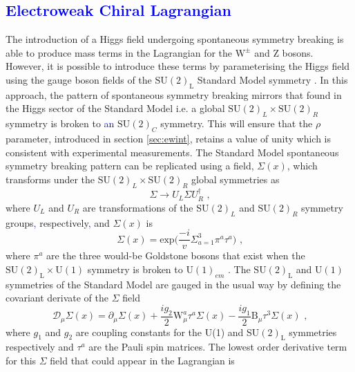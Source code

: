 \subsection{\textcolor{blue}{Electroweak Chiral Lagrangian}}
\label{sec:ewchiral}
The introduction of a Higgs field undergoing spontaneous symmetry breaking is able to produce mass terms in the Lagrangian for the $\text{W}^{\pm}$ and Z bosons.  However, it is possible to introduce these terms by parameterising the Higgs field using the gauge boson fields of the $\text{SU}(2)_{\text{L}}$ Standard Model symmetry \cite{Herrero:1994tj}.  In this approach, the pattern of spontaneous symmetry breaking mirrors that found in the Higgs sector of the Standard Model i.e. a global $\text{SU}(2)_{L} \times \text{SU}(2)_{R}$ symmetry is broken to \textcolor{blue}{an} $\text{SU}(2)_{C}$ symmetry.  This will ensure that the $\rho$ parameter, introduced in section \ref{sec:ewint}, retains a value of unity which is consistent with experimental measurements.  The Standard Model spontaneous symmetry breaking pattern can be replicated using a field, $\Sigma(x)$, which transforms under the $\text{SU}(2)_{L} \times \text{SU}(2)_{R}$ global symmetries as
%
\begin{equation}
\Sigma \rightarrow U_{L} \Sigma U_{R}^{\dagger} \text{ ,}
\end{equation}
%
\noindent where $U_{L}$ and $U_{R}$ are transformations of the $\text{SU}(2)_{L}$ and $\text{SU}(2)_{R}$ symmetry groups\textcolor{blue}{,} respectively\textcolor{blue}{,} and $\Sigma(x)$ is
%
\begin{equation}
\Sigma(x) = \text{exp} \bigg(\frac{-i}{v} \Sigma^{3}_{a=1} \pi^{a}\tau^{a}\bigg)\text{ ,}
\end{equation}
%
\noindent where $\pi^{a}$ are the three would-be Goldstone bosons that exist when the $\text{SU}(2)_{\text{L}} \times \text{U}(1)$ symmetry is broken to $\text{U}(1)_{em}$ \cite{Longhitano:1980tm}.  The $\text{SU}(2)_{\text{L}}$ and $\text{U}(1)$ symmetries of the Standard Model are gauged in the usual way by defining the covariant derivate of the $\Sigma$ field
%
\begin{equation}
\mathcal{D}_{\mu} \Sigma(x) = \partial_{\mu} \Sigma(x) + \frac{ig_{2}}{2}\text{W}_{\mu}^{a}\tau^{a}\Sigma(x) - \frac{ig_{1}}{2}\text{B}_{\mu}\tau^{3}\Sigma(x) \text{ ,}
\end{equation}
%
\noindent where $g_{1}$ and $g_{2}$ are coupling constants for the U(1) and SU$(2)_\text{L}$ symmetries respectively and $\tau^{a}$ are the Pauli spin matrices.  The lowest order derivative term for this $\Sigma$ field that could appear in the Lagrangian is
